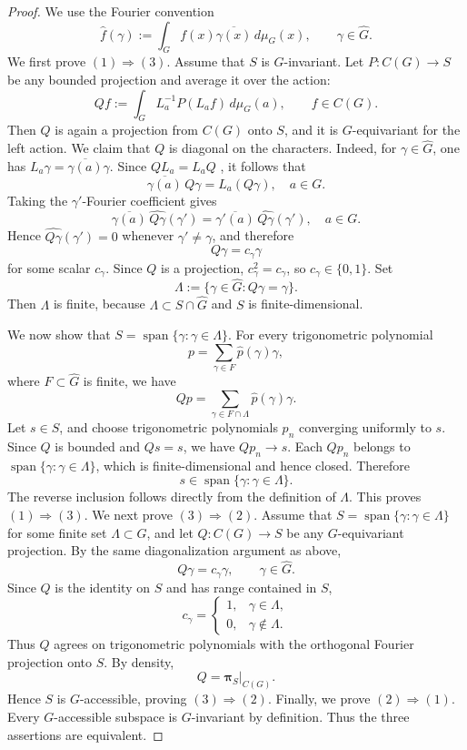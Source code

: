 \documentclass[11pt,showkeys]{amsart}
\begin{document}
\begin{proof}
We use the Fourier convention
\[
        \widehat f(\gamma)
        :=
        \int_G f(x)\overline{\gamma(x)}\,d\mu_G(x),
        \qquad
        \gamma\in\widehat G.
\]
We first prove \((1)\Rightarrow(3)\). Assume that \(S\) is
\(G\)-invariant. Let \(P:C(G)\to S\) be any bounded projection and
average it over the action:
\[
        Qf
        :=
        \int_G L_a^{-1}P(L_a f)\,d\mu_G(a),
        \qquad f\in C(G).
\]
Then \(Q\) is again a projection from \(C(G)\) onto \(S\), and it is
\(G\)-equivariant for the left action.
We claim that \(Q\) is diagonal on the characters. Indeed, for
\(\gamma\in\widehat G\), one has
 $ L_a\gamma=\overline{\gamma(a)}\gamma.$
Since \(QL_a= L_aQ\) , it follows that
\[
\overline{\gamma(a)}\,Q\gamma=L_a(Q\gamma), \quad a\in G.
\]
Taking the $\gamma'$-Fourier coefficient gives
\[
\overline{\gamma(a)}\,\widehat{Q\gamma}(\gamma')
=\overline{\gamma'(a)}\,\widehat{Q\gamma}(\gamma'), \quad a\in G.
\]
Hence \(\widehat{Q\gamma}(\gamma')=0\) whenever
\(\gamma'\neq\gamma\), and therefore
\[
        Q\gamma=c_\gamma\gamma
\]
for some scalar \(c_\gamma\). Since \(Q\) is a projection,
\(c_\gamma^2=c_\gamma\), so \(c_\gamma\in\{0,1\}\).
Set
\[
        \Lambda
        :=
        \{\gamma\in\widehat G:Q\gamma=\gamma\}.
\]
Then \(\Lambda\) is finite, because
\(\Lambda\subset S\cap\widehat G\) and \(S\) is finite-dimensional.

We now show that
$
        S=\operatorname{span}\{\gamma:\gamma\in\Lambda\}.
$
For every trigonometric polynomial
\[
        p=\sum_{\gamma\in F}\widehat p(\gamma)\gamma,
\]
where \(F\subset\widehat G\) is finite, we have
\[
        Qp
        =
        \sum_{\gamma\in F\cap\Lambda}
        \widehat p(\gamma)\gamma.
\]
Let \(s\in S\), and choose trigonometric polynomials \(p_n\) converging
uniformly to \(s\). Since \(Q\) is bounded and \(Qs=s\), we have
\(Qp_n\to s\). Each \(Qp_n\) belongs to
\(\operatorname{span}\{\gamma:\gamma\in\Lambda\}\), which is
finite-dimensional and hence closed. Therefore
\[
        s\in\operatorname{span}\{\gamma:\gamma\in\Lambda\}.
\]
The reverse inclusion follows directly from the definition of
\(\Lambda\). This proves \((1)\Rightarrow(3)\).
We next prove \((3)\Rightarrow(2)\). Assume that
$
        S=\operatorname{span}\{\gamma:\gamma\in\Lambda\}
$
for some finite set \(\Lambda\subset\widehat G\), and let
\(Q:C(G)\to S\) be any \(G\)-equivariant projection. By the same
diagonalization argument as above,
\[
        Q\gamma=c_\gamma\gamma,
        \qquad \gamma\in\widehat G.
\]
Since \(Q\) is the identity on \(S\) and has range contained in \(S\),
\[
        c_\gamma
        =
        \begin{cases}
        1, & \gamma\in\Lambda,\\
        0, & \gamma\notin\Lambda.
        \end{cases}
\]
Thus \(Q\) agrees on trigonometric polynomials with the orthogonal
Fourier projection onto \(S\). By density,
\[
        Q=\mathbf \pi_S|_{C(G)}.
\]
Hence \(S\) is \(G\)-accessible, proving \((3)\Rightarrow(2)\).
Finally, we prove \((2)\Rightarrow(1)\). Every \(G\)-accessible subspace
is \(G\)-invariant by definition. Thus the three assertions are
equivalent.


\end{proof}
\end{document}
